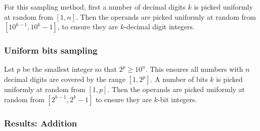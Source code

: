 For this sampling method, first a number of decimal digits $k$ is picked uniformly at random from $[1, n]$. Then the operands are picked uniformly at random from $[10^{k-1}, 10^k - 1]$, to ensure they are $k$-decimal digit integers.

\subsubsection{Uniform bits sampling}

Let $p$ be the smallest integer so that $2^p \geq {10}^n$. This ensures all numbers with $n$ decimal digits are covered by the range $[1, 2^p]$.
A number of bits $k$ is picked uniformly at random from $[1, p]$. Then the operands are picked uniformly at random from $[2^{k-1}, 2^k - 1]$ to ensure they are $k$-bit integers.

\subsubsection{Results: Addition}

\begin{table}[H]
    \begin{minipage}[t]{0.47\linewidth}
        \hfill
    \end{minipage}
    \hfill
    \begin{minipage}[t]{0.47\linewidth}
        \hfill
    \end{minipage}

    \vspace{0.5cm}
    \begin{minipage}[t]{0.47\linewidth}
        \hfill
    \end{minipage}
    \hfill
    \begin{minipage}[t]{0.47\linewidth}
        \hfill
    \end{minipage}
    \label{tbl:sampling_strategies_add}
\end{table}


